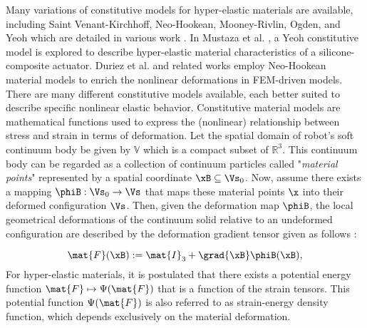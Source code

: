 Many variations of constitutive models for hyper-elastic materials are available, including Saint Venant-Kirchhoff, Neo-Hookean, Mooney-Rivlin, Ogden, and Yeoh \editl which are detailed in various work \cite{Meyer2009,Renaud2011,Kim2018} \editr. In Mustaza et al. \cite{Mustaza2019}, a Yeoh constitutive model is explored to describe hyper-elastic material characteristics of a silicone-composite actuator. Duriez et al. \cite{Duriez2013} and related works \cite{Coevoet2017,Largilliere2015} employ Neo-Hookean material models to enrich the nonlinear deformations in FEM-driven models. There are many different constitutive models available, each better suited to describe specific nonlinear elastic behavior. Constitutive material models are mathematical functions used to express the (nonlinear) relationship between stress and strain in terms of deformation. \editl Let the spatial domain of robot's soft continuum body be given by $\mathbb{V}$ which is a compact subset of $\mathbb{R}^3$. This continuum body can be regarded as a collection of continuum particles called "\textit{material points}" represented by a spatial coordinate $\xB \subseteq \Vs_0$. Now, assume there exists a mapping $\phiB: \Vs_0 \to \Vs$ that maps these material points $\x$ into their deformed configuration $\Vs$. Then, given the deformation map $\phiB$, the local geometrical deformations of the continuum solid relative to an undeformed configuration are described by the deformation gradient tensor given as follows \cite{Holzapfel2002,Kim2018}:\editr \vspace{-3mm}

\begin{equation}
\mat{F}(\xB) := \mat{I}_3 +
\grad{\xB}\phiB(\xB),
\end{equation}
%
For hyper-elastic materials, it is postulated that there exists a potential energy function $\mat{F} \mapsto \Psi(\mat{F})$ that is a function of the strain tensors. This potential function $\Psi(\mat{F})$ is also referred to as strain-energy density function, which depends exclusively on the material deformation.

